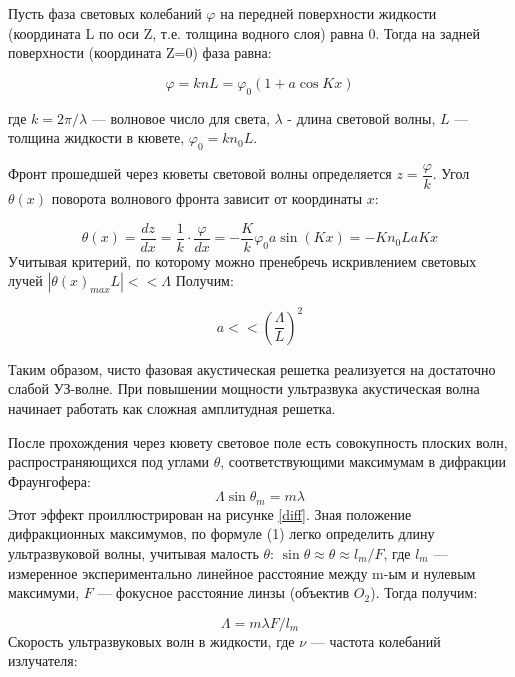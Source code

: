 \documentclass[a4paper,12pt]{article} %
\renewcommand{\phi}{\ensuremath{\varphi}} %
\theoremstyle{plain} %
\theoremstyle{definition} %
\theoremstyle{remark} %
\renewcommand{\phi}{\ensuremath{\varphi}}
\begin{document}
Пусть фаза световых колебаний $ \phi $ на передней поверхности жидкости (координата L по оси Z, т.е. толщина водного слоя) равна 0. Тогда на задней поверхности (координата Z=0) фаза равна:

\begin{equation}
	\phi  = k n L = \phi_0 (1 + a \cos K x)
\end{equation}
	
где $ k = 2 \pi / \lambda $ --- волновое число для света, $\lambda $ - длина световой волны, $ L $ --- толщина жидкости в кювете, $\phi_0=kn_0L$.


Фронт прошедшей через кюветы световой волны определяется $z=\dfrac{\phi}{k}$. Угол $\theta(x)$ поворота волнового фронта зависит от координаты $x$:

\begin{equation}
	\theta(x)=\dfrac{dz}{dx}=\dfrac{1}{k}\cdot\dfrac{\phi}{dx}=-\dfrac{K}{k}\phi_0a\sin(Kx)=-Kn_0LaKx
\end{equation}
Учитывая критерий, по которому можно пренебречь искривлением световых лучей $|\theta(x)_{max}L|<<\Lambda$ Получим:

\begin{equation}
	a<<\left(\dfrac{\Lambda}{L}\right)^2
\end{equation}

Таким образом, чисто фазовая акустическая решетка реализуется на достаточно слабой УЗ-волне. При повышении мощности ультразвука акустическая волна начинает работать как сложная амплитудная решетка.

После прохождения через кювету световое поле есть совокупность плоских волн, распространяющихся под углами $ \theta $, соответствующими максимумам в дифракции Фраунгофера:
\begin{equation}	
	\Lambda \sin \theta_m = m \lambda
\end{equation}		
Этот эффект проиллюстрирован на рисунке \ref{diff}.
Зная положение дифракционных максимумов, по формуле (1) легко определить длину ультразвуковой волны, учитывая малость $ \theta $: $ \sin \theta \approx \theta \approx l_m /F  $, где $ l_m $ --- измеренное экспериментально линейное расстояние между m-ым и нулевым максимуми, $ F $ --- фокусное расстояние линзы (объектив $O_2$). Тогда получим:
		
\begin{equation}
	\Lambda = m \lambda F/ l_m 
\end{equation}
Скорость ультразвуковых волн в жидкости, где $ \nu $ --- частота колебаний излучателя:
		
\end{document}
